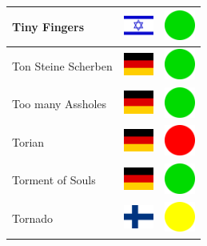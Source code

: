 \documentclass[12pt, a4paper, twoside]{report}
\begin{document}
\begin{center}
\begin{longtable}{|p{5cm}|p{2cm}|p{2cm}|}
 Tiny Fingers                                               & \includegraphics[width=1cm]{../img/flags/il} &   \includegraphics[width=1cm]{../likes/y} \\ \hline
 Ton Steine Scherben                                        & \includegraphics[width=1cm]{../img/flags/de} &   \includegraphics[width=1cm]{../likes/y} \\ \hline
 Too many Assholes                                          & \includegraphics[width=1cm]{../img/flags/de} &   \includegraphics[width=1cm]{../likes/y} \\ \hline
 Torian                                                     & \includegraphics[width=1cm]{../img/flags/de} &   \includegraphics[width=1cm]{../likes/n} \\ \hline
 Torment of Souls                                           & \includegraphics[width=1cm]{../img/flags/de} &   \includegraphics[width=1cm]{../likes/y} \\ \hline
 Tornado                                                    & \includegraphics[width=1cm]{../img/flags/fi} &   \includegraphics[width=1cm]{../likes/m} \\ \hline

\end{longtable}
\end{center}
\end{document}
